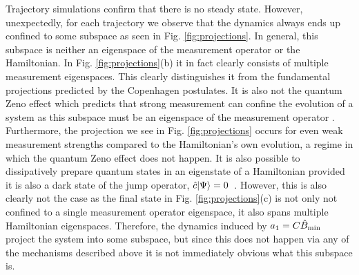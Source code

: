 Trajectory simulations confirm that there is no steady state. However,
unexpectedly, for each trajectory we observe that the dynamics always
ends up confined to some subspace as seen in
Fig. \ref{fig:projections}. In general, this subspace is neither an
eigenspace of the measurement operator or the Hamiltonian. In
Fig. \ref{fig:projections}(b) it in fact clearly consists of multiple
measurement eigenspaces. This clearly distinguishes it from the
fundamental projections predicted by the Copenhagen postulates. It is
also not the quantum Zeno effect which predicts that strong
measurement can confine the evolution of a system as this subspace
must be an eigenspace of the measurement operator \cite{misra1977,
  facchi2008, raimond2010, raimond2012, signoles2014}. Furthermore,
the projection we see in Fig. \ref{fig:projections} occurs for even
weak measurement strengths compared to the Hamiltonian's own
evolution, a regime in which the quantum Zeno effect does not
happen. It is also possible to dissipatively prepare quantum states in
an eigenstate of a Hamiltonian provided it is also a dark state of the
jump operator, $\hat{c} | \Psi \rangle = 0$~\cite{diehl2008}. However,
this is also clearly not the case as the final state in
Fig. \ref{fig:projections}(c) is not only not confined to a single
measurement operator eigenspace, it also spans multiple Hamiltonian
eigenspaces. Therefore, the dynamics induced by $a_1 = C\hat{B}_\mathrm{min}$ project
the system into some subspace, but since this does not happen via any
of the mechanisms described above it is not immediately obvious what
this subspace is.

